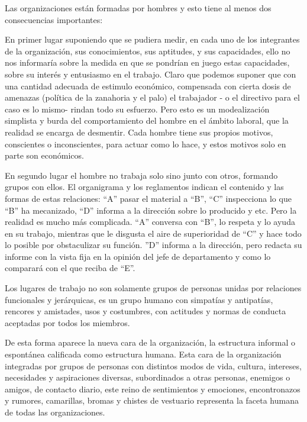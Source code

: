 Las organizaciones están formadas por hombres y esto tiene al menos dos consecuencias importantes:



En primer lugar suponiendo que se pudiera medir, en cada uno de los integrantes de la organización, sus conocimientos, sus aptitudes, y sus capacidades, ello no nos informaría sobre la medida en que se pondrían en juego estas capacidades, sobre su interés y entusiasmo en el trabajo. Claro que podemos suponer que con una cantidad adecuada de estimulo económico, compensada con cierta dosis de amenazas (política de la zanahoria y el palo) el trabajador - o el directivo para el caso es lo mismo- rindan todo su esfuerzo. Pero esto es un modealización simplista y burda del comportamiento del hombre en el ámbito laboral, que la realidad se encarga de desmentir. Cada hombre tiene sus propios motivos, conscientes o inconscientes, para actuar como lo hace, y estos motivos solo en parte son económicos.

En segundo lugar el hombre no trabaja solo sino junto con otros, formando grupos con ellos. El organigrama y los reglamentos indican el contenido y las formas de estas relaciones: “A” pasar el material a “B”, “C” inspecciona lo que “B” ha mecanizado, “D” informa a la dirección sobre lo producido y etc. Pero la realidad es mucho más complicada. “A” conversa con “B”, lo respeta y lo ayuda en su trabajo, mientras que le disgusta el aire de superioridad de “C” y hace todo lo posible por obstaculizar su función. ”D” informa a la dirección, pero redacta su informe con la vista fija en la opinión del jefe de departamento y como lo comparará con el que reciba de “E”.

Los lugares de trabajo no son solamente grupos de personas unidas por relaciones funcionales y jerárquicas, es un grupo humano con simpatías y antipatías, rencores y amistades, usos y costumbres, con actitudes y normas de conducta aceptadas por todos los miembros.

De esta forma aparece la nueva cara de la organización, la estructura informal o espontánea calificada como estructura humana. Esta cara de la organización integradas por grupos de personas con distintos modos de vida, cultura, intereses, necesidades y aspiraciones diversas, subordinados a otras personas, enemigos o amigos, de contacto diario, este reino de sentimientos y emociones, encontronazos y rumores, camarillas, bromas y chistes de vestuario representa la faceta humana de todas las organizaciones.

